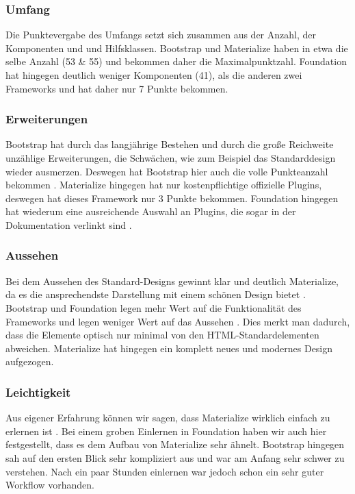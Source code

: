 \subsubsection{Umfang}
Die Punktevergabe des Umfangs setzt sich zusammen aus der Anzahl, der Komponenten und und Hilfsklassen. Bootstrap und Materialize haben in etwa die selbe Anzahl (53 \& 55) und bekommen daher die Maximalpunktzahl\cite{bootstrap-docu,materialize-docu,foundation-docu}. Foundation hat hingegen deutlich weniger Komponenten (41), als die anderen zwei Frameworks und hat daher nur 7 Punkte bekommen.
\subsubsection{Erweiterungen}
Bootstrap hat durch das langjährige Bestehen und durch die große Reichweite unzählige Erweiterungen, die Schwächen, wie zum Beispiel das Standarddesign wieder ausmerzen. Deswegen hat Bootstrap hier auch die volle Punkteanzahl bekommen \cite{introduction-bootstrap}. Materialize hingegen hat nur kostenpflichtige offizielle Plugins, deswegen hat dieses Framework nur 3 Punkte bekommen. Foundation hingegen hat wiederum eine ausreichende Auswahl an Plugins, die sogar in der Dokumentation verlinkt sind \cite{foundation-docu}. 
\subsubsection{Aussehen}
Bei dem Aussehen des Standard-Designs gewinnt klar und deutlich Materialize, da es die ansprechendste Darstellung mit einem schönen Design bietet \cite{materialize-docu}. Bootstrap und Foundation legen mehr Wert auf die Funktionalität des Frameworks und legen weniger Wert auf das Aussehen \cite{bootstrap-docu, foundation-docu}. Dies merkt man dadurch, dass die Elemente optisch nur minimal von den HTML-Standardelementen abweichen. Materialize hat hingegen ein komplett neues und modernes Design aufgezogen.
\subsubsection{Leichtigkeit}
Aus eigener Erfahrung können wir sagen, dass Materialize wirklich einfach zu erlernen ist \cite{materialize-docu}. Bei einem groben Einlernen in Foundation haben wir auch hier festgestellt, dass es dem Aufbau von Materialize sehr ähnelt. Bootstrap hingegen sah auf den ersten Blick sehr kompliziert aus und war am Anfang sehr schwer zu verstehen. Nach ein paar Stunden einlernen war jedoch schon ein sehr guter Workflow vorhanden.
